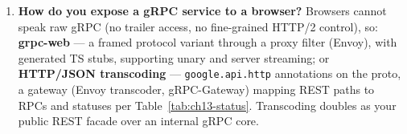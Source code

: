 \begin{enumerate}[label=\textbf{Q\arabic*.}, leftmargin=1.5cm]
        Reflection is an optional service (\texttt{grpc.reflection\ldots}) that
        lets clients enumerate services and fetch file descriptors at runtime.
        \texttt{grpcurl} uses it to build requests without a local
        \texttt{.proto}: \texttt{grpcurl -plaintext host:port list}. Enable it
        in dev and staging; consider disabling or authenticating it in
        production because it advertises your full API surface.
  \item \textbf{How do you expose a gRPC service to a browser?}
        Browsers cannot speak raw gRPC (no trailer access, no fine-grained
        HTTP/2 control), so: \textbf{grpc-web} --- a framed protocol variant
        through a proxy filter (Envoy), with generated TS stubs, supporting
        unary and server streaming; or \textbf{HTTP/JSON transcoding} ---
        \texttt{google.api.http} annotations on the proto, a gateway (Envoy
        transcoder, gRPC-Gateway) mapping REST paths to RPCs and statuses per
        Table~\ref{tab:ch13-status}. Transcoding doubles as your public REST
        facade over an internal gRPC core.


\end{enumerate}
